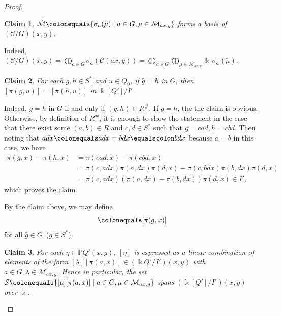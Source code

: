 \documentclass{surv-l}
\numberwithin{equation}{chapter}
\numberwithin{figure}{chapter}
\theoremstyle{plain}
\newtheorem{clm}{Claim}
\theoremstyle{definition}
\theoremstyle{remark}
\begin{document}
\begin{proof}
\begin{clm}
$\tilde{\mathcal{M}}\colonequals \{\sigma_a(\tilde{\mu}) \mid a \in G, \mu \in \mathcal{M}_{ax, y}\}$
forms a basis of $({\mathcal{C}}/G)(x, y)$.
\end{clm}

Indeed,
$({\mathcal{C}}/G)(x, y) = \bigoplus_{a \in G} \sigma_a({\mathcal{C}}(ax, y))
= \bigoplus_{a \in G}\bigoplus_{\mu \in \mathcal{M}_{ax,y}}\Bbbk\, \sigma_a(\tilde{\mu})
$.

\begin{clm}
For each $g,h\in S^*$ and $u \in Q_0$, if
$\bar{g}= \bar{h}$ in $G$,
then $[\pi(g,u)]=[\pi(h,u)]$ in $\Bbbk[Q']/I'$.
\end{clm}

Indeed, $\bar{g}=\bar{h}$ in $G$ if and only if
$(g,h) \in R^{\#}$.
If $g=h$, the the claim is obvious.
Otherwise, by definition of $R^\#$,
it is enough to show the statement
in the case that there exist
some $(a,b) \in R$ and $c,d\in S^*$ such that
$g=cad, h=cbd$.
Then noting that
$adx\colonequals \bar{a}\bar{d}x=\bar{b}\bar{d}x\equalscolon bdx$
because $\bar{a}=\bar{b}$ in this case, we have
\begin{equation*}
\begin{aligned}
\pi(g,x) - \pi(h,x)
&=
\pi(cad,x) - \pi(cbd,x) \\
&=
\pi(c,adx)\pi(a,dx)\pi(d,x)  - \pi(c,bdx)\pi(b,dx)\pi(d,x)\\
&=
\pi(c,adx)(\pi(a,dx) - \pi(b,dx))\pi(d,x) \in I',
\end{aligned}
\end{equation*}
which proves the claim.

By the claim above, we may define
\begin{equation*}
[\pi(\bar{g},x)]\colonequals  [\pi(g,x)]
\end{equation*}
for all $\bar{g} \in G$\ ($g\in S^*$).

\begin{clm}
For each $\eta \in \mathbb{P} Q'(x, y)$,
$[\eta]$ is expressed as a linear combination of elements of the form
$[\lambda][\pi(a,x)] \in (\Bbbk Q'/I')(x, y)$
with $a \in G, \lambda \in \mathcal{M}_{ax, y}$.
Hence in particular,
the set $\mathcal{S}\colonequals \{[\mu][\pi(a, x) ]\mid  a \in G, \mu \in \mathcal{M}_{ax, y}\}$
spans $(\Bbbk[Q']/I')(x, y)$ over $\Bbbk$.
\end{clm}


\end{proof}
\end{document}
